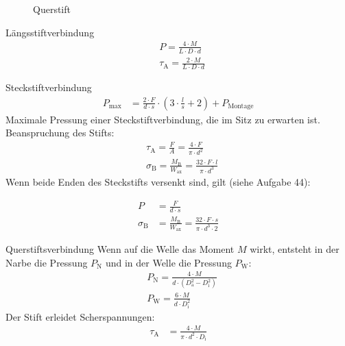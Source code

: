 \begin{figure}[H]
\begin{minipage}[b]{0.22\linewidth}
		\caption*{Querstift}
	\end{minipage}
\end{figure}

\begin{eeqn}{Längsstiftverbindung}
	\begin{align}
		& P = \frac{4\cdot M}{L \cdot D \cdot d}\\
		& \tau_\text{A} = \frac{2\cdot M}{L \cdot D \cdot d}
	\end{align}
\end{eeqn}

\begin{eeqn}{Steckstiftverbindung}
	\begin{align}
		P_\text{max} &= \frac{2\cdot F}{d \cdot s}\cdot \left(3 \cdot \frac{l}{s}+2\right) + P_\text{Montage}
	\end{align}
	Maximale Pressung einer Steckstiftverbindung, die im Sitz zu erwarten ist. \\
	Beanspruchung des Stifts:
	\begin{align}
		&\tau_\text{A} = \frac{F}{A} = \frac{4\cdot F}{\pi \cdot d^2}\\
		&\sigma_\text{B} = \frac{M_\text{B}}{W_\text{ax}} = \frac{32\cdot F \cdot l}{\pi \cdot d^3}
 	\end{align}
 	Wenn beide Enden des Steckstifts versenkt sind, gilt (siehe Aufgabe 44):

	\begin{align}
		P &= \frac{F}{d\cdot s} \\
		\sigma_\text{B} &= \frac{M_\text{B}}{W_\text{ax}} = \frac{32\cdot F \cdot s}{\pi \cdot d^3 \cdot 2}
	\end{align}
\end{eeqn}



\begin{eeqn}{Querstiftsverbindung}
	Wenn auf die Welle das Moment $M$ wirkt, entsteht in der Narbe die Pressung $P_\text{N}$ und in der Welle die Pressung $P_\text{W}$:
	\begin{align}
		& P_\text{N} = \frac{4\cdot M}{d\cdot(D_\text{a}^2-D_\text{i}^2)} \\
		& P_\text{W} = \frac{6\cdot M}{d \cdot D_\text{i}^2}
	\end{align}
	Der Stift erleidet Scherspannungen:
	\begin{align}
		\tau_\text{A} &= \frac{4\cdot M}{\pi \cdot d^2 \cdot D_\text{i}}
	\end{align}
\end{eeqn}

